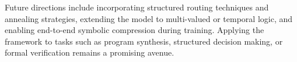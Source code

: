 Future directions include incorporating structured routing techniques and annealing strategies, extending the model to multi-valued or temporal logic, and enabling end-to-end symbolic compression during training. Applying the framework to tasks such as program synthesis, structured decision making, or formal verification remains a promising avenue.
